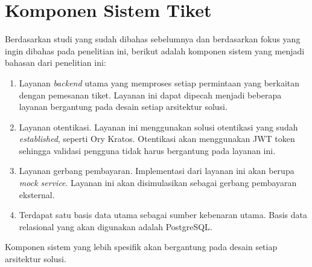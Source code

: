 \section{Komponen Sistem Tiket}

Berdasarkan studi yang sudah dibahas sebelumnya dan berdasarkan fokus yang ingin dibahas pada penelitian ini, berikut adalah komponen sistem yang menjadi bahasan dari penelitian ini:

\begin{enumerate}
    \item Layanan \textit{backend} utama yang memproses setiap permintaan yang berkaitan dengan pemesanan tiket. Layanan ini dapat dipecah menjadi beberapa layanan bergantung pada desain setiap arsitektur solusi.
    \item Layanan otentikasi. Layanan ini menggunakan solusi otentikasi yang sudah \textit{established}, seperti Ory Kratos. Otentikasi akan menggunakan JWT token sehingga validasi pengguna tidak harus bergantung pada layanan ini.
    \item Layanan gerbang pembayaran. Implementasi dari layanan ini akan berupa \textit{mock service}. Layanan ini akan disimulasikan sebagai gerbang pembayaran eksternal.
    \item Terdapat satu basis data utama sebagai sumber kebenaran utama. Basis data relasional yang akan digunakan adalah PostgreSQL.
\end{enumerate}

Komponen sistem yang lebih spesifik akan bergantung pada desain setiap arsitektur solusi.